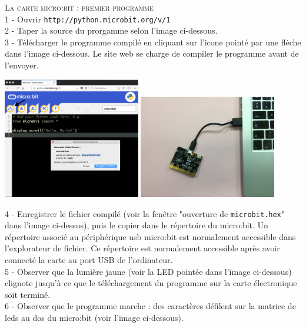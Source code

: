 \documentclass[a4paper, 11pt]{article}           %
\newcommand{\partie}[1]{\textsc{\huge #1} }
\begin{document}
\partie{La carte micro:bit : premier programme}\\ %
1 - Ouvrir \texttt{http://python.microbit.org/v/1} \\
2 - Taper la source du prorgamme selon l'image ci-dessous. \\
3 - Télécharger le programme compilé en cliquant sur l'icone pointé par une flèche dans l'image ci-dessous. Le site web se charge de compiler le programme avant de l'envoyer.  \\
\begin{center}
\includegraphics[width=0.45\textwidth]{editeur_compilateur}
\includegraphics[width=0.45\textwidth]{microbit_telechargement}\\
\end{center}
4 - Enregistrer le fichier compilé (voir la fenêtre "ouverture de \texttt{microbit.hex}" dans l'image ci-dessus), puis le copier dans le répertoire du micro:bit. Un répertoire associé au périphérique usb micro:bit est normalement accessible dans l'explorateur de fichier. Ce répertoire est normalement accessible après avoir connecté la carte au port USB de l'ordinateur. \\
5 - Observer que la lumière jaune (voir la LED pointée dans l'image ci-dessous) clignote jusqu'à ce que le téléchargement du programme sur la carte électronique soit terminé. \\
6 - Observer que le programme marche : des caractères défilent sur la matrice de leds au dos du micro:bit (voir l'image ci-dessous).
\end{document}
